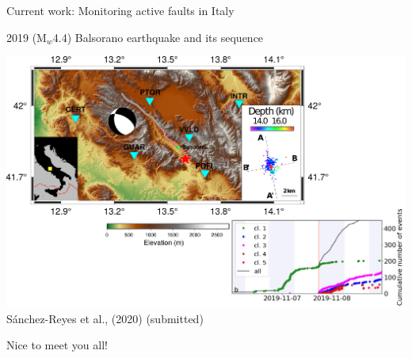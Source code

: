 \documentclass[aspectratio=43,9pt]{beamer}
\begin{document}
\begin{frame}
 {Current work: Monitoring active faults in Italy}

   \begin{center}
     2019 (M$_w$4.4) Balsorano earthquake and its sequence \\    
   \end{center}
   \vskip 0.2cm
 \includegraphics[width=1\linewidth]{Figures/Mapa_Bolsonaro_Edited} \\

    \vskip -1cm S\'anchez-Reyes et al., (2020) (submitted)

\end{frame}

\begin{frame}

\begin{center}
 \huge Nice to meet you all!
\end{center}


\end{frame}
\end{document}
